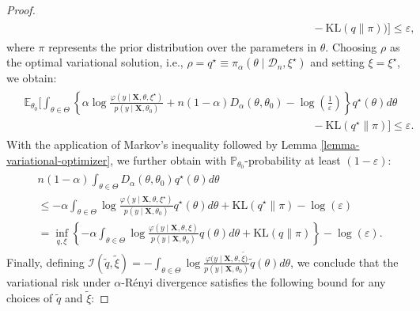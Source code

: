 \documentclass[12pt]{article}
\numberwithin{equation}{section}
\begin{document}
\begin{proof}
\begin{align}
\begin{split}
        &\qquad\qquad\qquad\qquad\qquad\qquad\qquad\qquad\qquad\qquad\qquad\qquad\qquad-\mathrm{KL}(q\parallel \pi)\Big)\Big]\leq \varepsilon,
    \end{split}
\end{align}
where $\pi$ represents the prior distribution over the parameters in $\theta$. Choosing $\rho$ as the optimal variational solution, i.e., $\rho = q^\star \equiv \pi_{\alpha}(\theta \mid \mathcal{D}_n, \xi^\star)$ and setting $\xi = \xi^\star$, we obtain:
\begin{align}\label{eq:proof-lemma-majorization-renyi-5}
    \begin{split}
        &\mathbb{E}_{\theta_{0}}\Big[\int_{\theta\in \Theta }\left\{\alpha\log\frac{\varphi(y\mid \mathbf{X}, \theta, \xi^\star)}{p(y\mid \mathbf{X}, \theta_{0})} + n(1-\alpha)D_{\alpha}(\theta, \theta_{0}) - \log\left(\frac{1}{\varepsilon}\right)\right\}q^{\star}(\theta)d\theta\\
        &\qquad\qquad\qquad\qquad\qquad\qquad\qquad\qquad\qquad\qquad\qquad\qquad\qquad- \mathrm{KL}(q^\star\parallel \pi)\Big] \leq \varepsilon.
    \end{split}
\end{align}
With the application of Markov's inequality followed by Lemma \ref{lemma-variational-optimizer}, we further obtain with $\mathbb{P}_{\theta_{0}}$-probability at least $(1-\varepsilon)$:
\begin{align}\label{eq:proof-lemma-majorization-renyi-6}
    \begin{split}
        &n(1-\alpha)\int_{\theta\in \Theta}D_{\alpha}(\theta, \theta_{0})q^{\star}(\theta)d\theta\\
        &\leq -\alpha \int_{\theta\in \Theta}\log \frac{\varphi(y\mid \mathbf{X}, \theta, \xi^{\star})}{p(y\mid \mathbf{X}, \theta_{0})}q^{\star}(\theta)d\theta + \mathrm{KL}(q^{\star}\parallel \pi)
        - \log\left(\varepsilon\right)\\
        &= \inf_{q, \xi}\left\{-\alpha\int_{\theta\in \Theta }\log\frac{\varphi(y\mid \mathbf{X}, \theta, \xi)}{p(y\mid \mathbf{X}, \theta_{0})}q(\theta)d\theta + \mathrm{KL}(q\parallel \pi)\right\}
        - \log\left(\varepsilon\right).
    \end{split}
\end{align}
Finally, defining $\mathcal{I}(\tilde{q},\tilde{\xi}) = -\int_{\theta\in \Theta }\log\frac{\varphi(y\mid \mathbf{X}, \theta, \tilde{\xi)}}{p(y\mid \mathbf{X}, \theta_{0})}\tilde{q}(\theta)d\theta$, we conclude that the variational risk under $\alpha$-R\'{e}nyi divergence satisfies the following bound for any choices of $\tilde{q}$ and $\tilde{\xi}$:

\end{proof}
\end{document}
